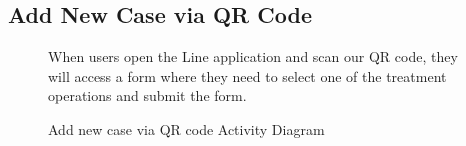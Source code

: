 \documentclass[12pt,oneside,openright,a4paper]{cpe-english-project}
\begin{document}
      \subsection{Add New Case via QR Code}
      \begin{figure}[!h]
        \centering
        \caption{Add new case via QR code Activity Diagram}\label{fig:AD_AddCase}
        \begin{flushleft}
          \qquad When users open the Line application and scan our QR code, they will access a form where they need to select one of the treatment operations and submit the form.  \par
        \end{flushleft}
      \end{figure}
\end{document}
